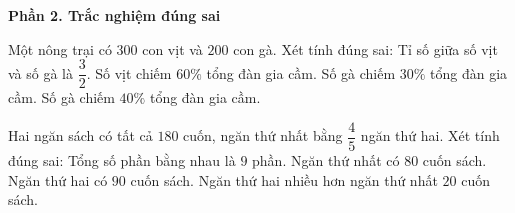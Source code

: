 \textbf{Phần 2. Trắc nghiệm đúng sai}

\begin{ex} %
Một nông trại có $300$ con vịt và $200$ con gà. Xét tính đúng sai:
\choiceTF
{\True Tỉ số giữa số vịt và số gà là $\dfrac{3}{2}$.}
{\True Số vịt chiếm $60\%$ tổng đàn gia cầm.}
{Số gà chiếm $30\%$ tổng đàn gia cầm.}
{\True Số gà chiếm $40\%$ tổng đàn gia cầm.}
\end{ex}

\begin{ex} %
Hai ngăn sách có tất cả $180$ cuốn, ngăn thứ nhất bằng $\dfrac{4}{5}$ ngăn thứ hai. Xét tính đúng sai:
\choiceTF
{\True Tổng số phần bằng nhau là $9$ phần.}
{\True Ngăn thứ nhất có $80$ cuốn sách.}
{Ngăn thứ hai có $90$ cuốn sách.}
{\True Ngăn thứ hai nhiều hơn ngăn thứ nhất $20$ cuốn sách.}
\end{ex}

